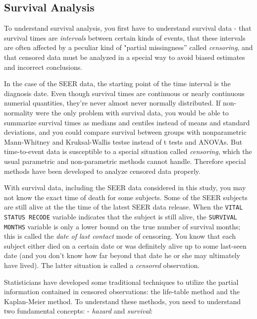 \documentclass[a4paper,11pt]{article}
\newcommand{\codewhite}[1]{\colorbox{white}{\texttt{#1}}}
\begin{document}

\subsection{Survival Analysis}
\label{subsec:survprimer}



To understand survival analysis, you first have to understand survival data - that survival times are \textit{intervals} between certain kinds of events, that these intervals are often affected by a peculiar kind of "partial missingness'' called \textit{censoring}, and that censored data must be analyzed in a special way to avoid biased estimates and incorrect conclusions.

In the case of the SEER data, the starting point of the time interval is the diagnosis date. Even though survival times are continuous or nearly continuous numerial quantities, they're never almost never normally distributed. If non-normality were the only problem with survival data, you would be able to summarize survival times as medians and centiles instead of means and standard deviations, and you could compare survival between groups with nonparametric Mann-Whitney and Kruksal-Wallis testse instead of t tests and ANOVAs. But time-to-event data is susceptible to a special situation called \textit{censoring}, which the usual parametric and non-parametric methods cannot handle. Therefore special methods have been developed to analyze censored data properly. 

With survival data, including the SEER data considered in this study, you may not know the exact time of death for some subjects. Some of the SEER subjects are still alive at the the time of the latest SEER data release. When the \codewhite{VITAL STATUS RECODE} variable indicates that the subject is still alive, the \codewhite{SURVIVAL MONTHS} variable is only a lower bound on the true number of survival months; this is called the \textit{date of last contact} mode of censoring. You know that each subject either died on a certain date or was definitely alive up to some last-seen date (and you don't know how far beyond that date he or she may ultimately have lived). The latter situation is called a \textit{censored} observation. 

Statisticians have developed some traditional techniques to utilize the partial information contained in censored observations: the life-table method and the Kaplan-Meier method. To understand these methods, you need to understand two fundamental concepts: - \textit{hazard} and \textit{survival}:
\end{document}
